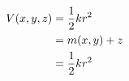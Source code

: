 \documentclass[preview]{standalone}
\begin{document}
\begin{align*}
\special{dvisvgm:raw <g id='unique000'>}V(x, y, z) &= \frac{1}{2} k r^2 \\ \special{dvisvgm:raw </g>}\special{dvisvgm:raw <g id='unique001'>}&= m(x, y) + z \\ \special{dvisvgm:raw </g>}\special{dvisvgm:raw <g id='unique002'>}&= \frac{1}{2} k r^2\special{dvisvgm:raw </g>}
\end{align*}
\end{document}
